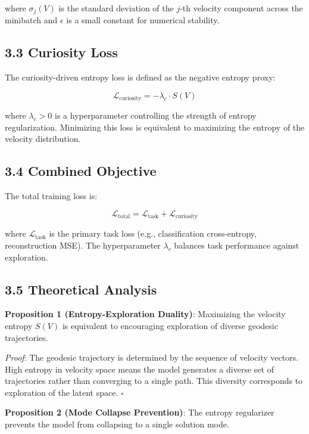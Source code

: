 \documentclass[12pt]{article}
\begin{document}
where $\sigma_j(V)$ is the standard deviation of the $j$-th velocity component across the minibatch and $\epsilon$ is a small constant for numerical stability.

\subsection{3.3 Curiosity Loss}

The curiosity-driven entropy loss is defined as the negative entropy proxy:

\begin{equation}
\mathcal{L}_{\text{curiosity}} = -\lambda_c \cdot S(V)
\end{equation}

where $\lambda_c > 0$ is a hyperparameter controlling the strength of entropy regularization. Minimizing this loss is equivalent to maximizing the entropy of the velocity distribution.

\subsection{3.4 Combined Objective}

The total training loss is:

\begin{equation}
\mathcal{L}_{\text{total}} = \mathcal{L}_{\text{task}} + \mathcal{L}_{\text{curiosity}}
\end{equation}

where $\mathcal{L}_{\text{task}}$ is the primary task loss (e.g., classification cross-entropy, reconstruction MSE). The hyperparameter $\lambda_c$ balances task performance against exploration.

\subsection{3.5 Theoretical Analysis}

\textbf{Proposition 1 (Entropy-Exploration Duality)}: Maximizing the velocity entropy $S(V)$ is equivalent to encouraging exploration of diverse geodesic trajectories.

\textit{Proof}: The geodesic trajectory is determined by the sequence of velocity vectors. High entropy in velocity space means the model generates a diverse set of trajectories rather than converging to a single path. This diversity corresponds to exploration of the latent space. $\square$

\textbf{Proposition 2 (Mode Collapse Prevention)}: The entropy regularizer prevents the model from collapsing to a single solution mode.
\end{document}
